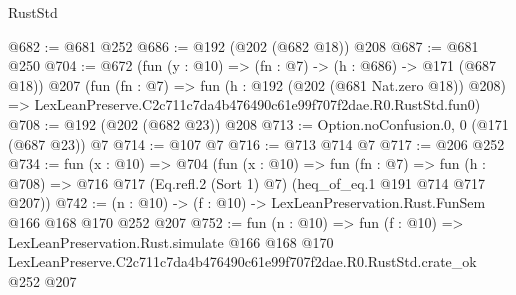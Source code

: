 \begin{lexlean}{RustStd}
\begin{coremodule}
@682 := @681 @252
@686 := @192 (@202 (@682 @18)) @208
@687 := @681 @250
@704 := @672
    (fun (y : @10) => (fn : @7) -> (h : @686) -> @171 (@687 @18))
    @207
    (fun (fn : @7) =>
    fun (h : @192 (@202 (@681 Nat.zero @18)) @208) =>
    LexLeanPreserve.C2c711c7da4b476490c61e99f707f2dae.R0.RustStd.fun0)
@708 := @192 (@202 (@682 @23)) @208
@713 := Option.noConfusion.{0, 0} (@171 (@687 @23)) @7
@714 := @107 @7
@716 := @713 @714 @7
@717 := @206 @252
@734 := fun (x : @10) =>
  @704
    (fun (x : @10) =>
    fun (fn : @7) =>
    fun (h : @708) => @716 @717 (Eq.refl.{2} (Sort 1) @7) (heq_of_eq.{1} @191 @714 @717 @207))
@742 := (n : @10) -> (f : @10) -> LexLeanPreservation.Rust.FunSem @166 @168 @170 @252 @207
@752 := fun (n : @10) =>
  fun (f : @10) =>
  LexLeanPreservation.Rust.simulate
    @166
    @168
    @170
    LexLeanPreserve.C2c711c7da4b476490c61e99f707f2dae.R0.RustStd.crate_ok
    @252
    @207
\end{coremodule}
\end{lexlean}
